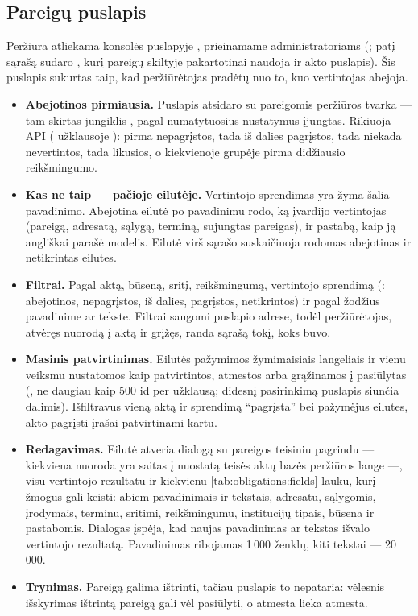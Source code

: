 \subsection{Pareigų puslapis}

Peržiūra atliekama konsolės puslapyje , prieinamame administratoriams
(; patį sąrašą sudaro
, kurį pareigų skiltyje pakartotinai naudoja ir akto
puslapis). Šis puslapis sukurtas taip, kad peržiūrėtojas pradėtų nuo to, kuo vertintojas abejoja.

\begin{itemize}
  \item \textbf{Abejotinos pirmiausia.} Puslapis atsidaro su  pareigomis peržiūros
    tvarka --- tam skirtas jungiklis , pagal numatytuosius nustatymus
    įjungtas. Rikiuoja API
    ( užklausoje ): pirma nepagrįstos, tada iš
    dalies pagrįstos, tada niekada nevertintos, tada likusios, o kiekvienoje grupėje pirma
    didžiausio reikšmingumo.
  \item \textbf{Kas ne taip --- pačioje eilutėje.} Vertintojo sprendimas yra žyma šalia pavadinimo.
    Abejotina eilutė po pavadinimu rodo, ką įvardijo vertintojas (pareigą, adresatą, sąlygą,
    terminą, sujungtas pareigas), ir pastabą, kaip ją angliškai parašė modelis. Eilutė virš
    sąrašo suskaičiuoja rodomas abejotinas ir netikrintas eilutes.
  \item \textbf{Filtrai.} Pagal aktą, būseną, sritį, reikšmingumą, vertintojo sprendimą
    (: abejotinos, nepagrįstos, iš dalies, pagrįstos, netikrintos) ir pagal
    žodžius pavadinime ar tekste. Filtrai saugomi puslapio adrese, todėl peržiūrėtojas, atvėręs
    nuorodą į aktą ir grįžęs, randa sąrašą tokį, koks buvo.
  \item \textbf{Masinis patvirtinimas.} Eilutės pažymimos žymimaisiais langeliais ir vienu
    veiksmu nustatomos kaip patvirtintos, atmestos arba grąžinamos į pasiūlytas
    (, ne daugiau kaip 500 id per užklausą; didesnį
    pasirinkimą puslapis siunčia dalimis). Išfiltravus vieną aktą ir sprendimą
    \enquote{pagrįsta} bei pažymėjus eilutes, akto pagrįsti įrašai patvirtinami kartu.
  \item \textbf{Redagavimas.} Eilutė atveria dialogą su pareigos teisiniu pagrindu ---
    kiekviena nuoroda yra saitas į nuostatą teisės aktų bazės peržiūros lange ---, visu
    vertintojo rezultatu ir kiekvienu \cref{tab:obligations:fields} lauku, kurį žmogus gali
    keisti: abiem pavadinimais ir tekstais, adresatu, sąlygomis, įrodymais, terminu, sritimi,
    reikšmingumu, institucijų tipais, būsena ir pastabomis. Dialogas įspėja, kad naujas
    pavadinimas ar tekstas išvalo vertintojo rezultatą. Pavadinimas ribojamas 1\,000 ženklų, kiti
    tekstai --- 20\,000.
  \item \textbf{Trynimas.} Pareigą galima ištrinti, tačiau puslapis to nepataria: vėlesnis
    išskyrimas ištrintą pareigą gali vėl pasiūlyti, o atmesta lieka atmesta.
\end{itemize}

